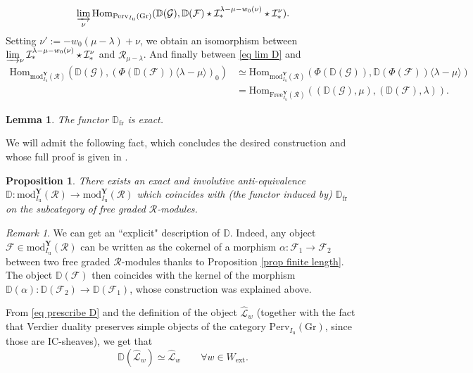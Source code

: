 \documentclass[11pt]{amsart}
\theoremstyle{plain}
\newtheorem{lem}[thm]{Lemma}
\newtheorem{prop}[thm]{Proposition}
\theoremstyle{remark}
\newtheorem{rem}[thm]{Remark}
\numberwithin{equation}{section}
\begin{document}
	\begin{equation}\label{eq lim D}
		\varinjlim_\nu \mathrm{Hom}_{\mathrm{Perv}_{I_\mathrm{u}}(\mathrm{Gr})}(\mathbb{D}(\mathcal{G}),\mathbb{D}(\mathcal{F})\star\mathcal{I}^{\lambda-\mu-w_0(\nu)}_*\star\mathcal{I}^{\nu}_*).
	\end{equation}
	Setting $\nu':=-w_0(\mu-\lambda)+\nu$, we obtain an isomorphism between $\varinjlim_\nu \mathcal{I}^{\lambda-\mu-w_0(\nu)}_*\star\mathcal{I}^{\nu}_*$ and $\mathcal{R}_{\mu-\lambda}$. And finally between \eqref{eq lim D} and 
	\begin{align*}
		\mathrm{Hom}_{\mathrm{mod}^\mathbf{Y}_{I_\mathrm{u}}(\mathcal{R})}(\mathbb{D}(\mathcal{G}),(\Phi(\mathbb{D}(\mathcal{F}))\langle\lambda-\mu\rangle)_0)&\simeq \mathrm{Hom}_{\mathrm{mod}^\mathbf{Y}_{I_\mathrm{u}}(\mathcal{R})}(\Phi(\mathbb{D}(\mathcal{G})),\mathbb{D}(\Phi(\mathcal{F}))\langle\lambda-\mu\rangle)\\
		&=\mathrm{Hom}_{\mathrm{Free}^\mathbf{Y}_{I_\mathrm{u}}(\mathcal{R})}((\mathbb{D}(\mathcal{G}),\mu),(\mathbb{D}(\mathcal{F}),\lambda)).
	\end{align*}
	\begin{lem}{{\cite[Lemma 9.2]{achar2022geometric}}}\label{lem exact D}
		The functor  $\mathbb{D}_{\mathrm{fr}}$ is exact.
	\end{lem}
	We will admit the following fact, which concludes the desired construction and whose full proof is given in \cite[§9.1]{achar2022geometric}.
	\begin{prop}\label{prop D}
		There exists an exact and involutive anti-equivalence $\mathbb{D}:\mathrm{mod}^\mathbf{Y}_{I_\mathrm{u}}(\mathcal{R})\to \mathrm{mod}^\mathbf{Y}_{I_\mathrm{u}}(\mathcal{R})$ which coincides with (the functor induced by) $\mathbb{D}_{\mathrm{fr}}$ on the subcategory of free graded $\mathcal{R}$-modules.
	\end{prop}
	\begin{rem}\label{rem duality}
		We can get an ``explicit" description of $\mathbb{D}$. Indeed, any object $\mathcal{F}\in \mathrm{mod}^\mathbf{Y}_{I_\mathrm{u}}(\mathcal{R})$ can be written as the cokernel of a morphism $\alpha:\mathcal{F}_1\to \mathcal{F}_2$ between two free graded $\mathcal{R}$-modules thanks to Proposition \ref{prop finite length}. The object $\mathbb{D}(\mathcal{F})$ then coincides with the kernel of the morphism $\mathbb{D}(\alpha):\mathbb{D}(\mathcal{F}_2)\to \mathbb{D}(\mathcal{F}_1)$, whose construction was explained above. 
	\end{rem}
	From \eqref{eq prescribe D} and the definition of the object $\widehat{\mathcal{L}}_w$ (together with the fact that Verdier duality preserves simple objects of the category $\mathrm{Perv}_{I_\mathrm{u}}(\mathrm{Gr})$, since those are IC-sheaves), we get that
	\begin{equation}\label{eq D reserves simples}
		\mathbb{D}(\widehat{\mathcal{L}}_w)\simeq \widehat{\mathcal{L}}_w\qquad\forall w\in W_{\mathrm{ext}}. 
	\end{equation}
\end{document}
